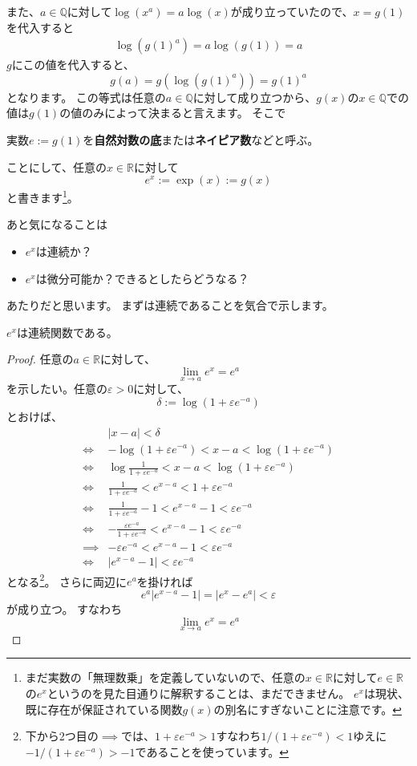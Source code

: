 また、$a\in\mathbb{Q}$に対して$\log(x^a)=a\log(x)$が成り立っていたので、$x=g(1)$を代入すると
\begin{align*}
  \log(g(1)^a)=a\log(g(1))=a
\end{align*}
$g$にこの値を代入すると、
\[
  g(a)=g(\log(g(1)^a))=g(1)^a
\]
となります。
この等式は任意の$a\in\mathbb{Q}$に対して成り立つから、$g(x)$の$x\in\mathbb{Q}$での値は$g(1)$の値のみによって決まると言えます。
そこで
\begin{definition}
  実数$e:=g(1)$を\textbf{自然対数の底}または\textbf{ネイピア数}などと呼ぶ。
\end{definition}
\noindent
ことにして、任意の$x\in\mathbb{R}$に対して
\[
  e^x:=\exp(x):=g(x)
\]
と書きます\footnote{
  まだ実数の「無理数乗」を定義していないので、任意の$x\in\mathbb{R}$に対して$e\in\mathbb{R}$の$e^x$というのを見た目通りに解釈することは、まだできません。
  $e^x$は現状、既に存在が保証されている関数$g(x)$の別名にすぎないことに注意です。
}。

あと気になることは
\begin{itemize}
  \item $e^x$は連続か？
  \item $e^x$は微分可能か？できるとしたらどうなる？
\end{itemize}
あたりだと思います。
まずは連続であることを気合で示します。
\begin{theorem}
  $e^x$は連続関数である。
\end{theorem}
\begin{proof}
  任意の$a\in\mathbb{R}$に対して、
  \[
    \lim_{x\to a}e^x=e^a
  \]
  を示したい。任意の$\varepsilon>0$に対して、
  \[
    \delta:=\log(1+\varepsilon e^{-a})
  \]
  とおけば、
  \begin{align*}
    &|x-a|<\delta\\
    \iff&-\log(1+\varepsilon e^{-a})<x-a<\log(1+\varepsilon e^{-a})\\
    \iff&\log\frac1{1+\varepsilon e^{-a}}<x-a<\log(1+\varepsilon e^{-a})\\
    \iff&\frac1{1+\varepsilon e^{-a}}<e^{x-a}<1+\varepsilon e^{-a}\\
    \iff&\frac1{1+\varepsilon e^{-a}}-1<e^{x-a}-1<\varepsilon e^{-a}\\
    \iff&-\frac{\varepsilon e^{-a}}{1+\varepsilon e^{-a}}<e^{x-a}-1<\varepsilon e^{-a}\\
    \implies&-\varepsilon e^{-a}<e^{x-a}-1<\varepsilon e^{-a}\\
    \iff&|e^{x-a}-1|<\varepsilon e^{-a}
  \end{align*}
  となる\footnote{
    下から2つ目の$\implies$では、$1+\varepsilon e^{-a}>1$すなわち$1/(1+\varepsilon e^{-a})<1$ゆえに$-1/(1+\varepsilon e^{-a})>-1$であることを使っています。
  }。
  さらに両辺に$e^a$を掛ければ
  \[
    e^a|e^{x-a}-1|=|e^x-e^a|<\varepsilon
  \]
  が成り立つ。
  すなわち
  \[
    \lim_{x\to a}e^x=e^a
  \]
\end{proof}


